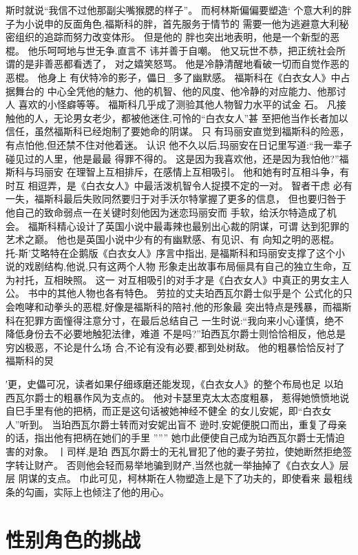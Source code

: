 \documentclass[portrait,a4paper]{article}
\begin{document}
斯时就说“我信不过他那副尖嘴猴腮的样子”。 而柯林斯偏偏要塑造`
个意大利的胖子为小说申的反面角色,福斯科的胖，首先服务于情节的
需要一他为逃避意大利秘密组织的追踪而努力改变体形。 但是他的
胖也突出地表明，他是一个新型的恶棍。 他乐呵呵地与世无争.直言不
讳并善于自嘲。 他又玩世不恭，把正统社会所谓的是非善恶都看透了，
对之嬉笑怒骂。 他是冷静清醒地看破一切而自觉作恶的恶棍。 他身上
有伏特冷的影子，儡日_多了幽默感。 福斯科在《白衣女人》中占据舞台的
中心全凭他的魅力、他的机智、他的风度、他冷静的对应能力、他那讨人
喜欢的小怪癖等等。 福斯科几乎成了测验其他人物智力水平的试金
石。 凡接触他的人，无论男女老少，都被他迷住,可怜的“白衣女人”甚
至把他当作长者加以信任，虽然福斯科已经炮制了要她命的阴谋。 只
有玛丽安直觉到福斯科的险恶，有点怕他,但还禁不住对他着迷。 认识
他不久以后,玛丽安在日记里写道:“我一辈子碰见过的人里，他是最最
得罪不得的。 这是因为我喜欢他，还是因为我怕他?”福斯科与玛丽安
在理智上互相排斥，在感情上互相吸引。 他和她有时互相斗争，有时互
相逗弄，是《白衣女人》中最活泼机智令人捉摸不定的一对。 智者干虑
必有一失，福斯科最后失败同然要归于对手沃尔特掌握了更多的信息，
但也要归咎于他自己的致命弱点一在关键时刻他因为迷恋玛丽安而
手软，给沃尔特造成了机会。
福斯科精心设计了英国小说中最毒辣也最别出心裁的阴谋，可谓
达到犯罪的艺术之巅。 他也是英国小说中少有的有幽默感、有见识、有
向知之明的恶棍。 托-斯'艾略特在企鹅版《白衣女人》序言中指出,
是福斯科和玛丽安支撑了这个小说的戏剧结构,他说,只有这两个人物
形象走出故事布局俪具有自己的独立生命，互为衬托，互相映照。 这一
对互相吸引的对手才是《白衣女人》中真正的男女主人公。
书中的其他人物也各有特色。 劳拉的丈夫珀西瓦尔爵士似乎是个
公式化的只会咆哮和动拳头的恶棍,好像是福斯科的陪衬,他的形象最
突出特点是残暴，而福斯科在犯罪方面憧得注意分寸，在最后总结自己
一生时说:“我向来小心谨慎，绝不降低身份去不必要地触犯法律，难道
不是吗?”珀西瓦尔爵士则恰恰相反，他总是穷凶极恶，不论是什么场
合,不论有没有必要,都到处树敌。 他的粗暴恰恰反衬了福斯科的炅

′更，史儡可况，读者如果仔细琢磨还能发现，《白衣女人》的整个布局也足
以珀西瓦尔爵士的粗暴作风为支点的。 他对卡瑟里克太太态度粗暴，
惹得她愤愤地说自巳手里有他的把柄，而正是这句话被她神经不健全
的女儿安妮，即“白衣女人”听到。 当珀西瓦尔爵士转而对安妮出盲不
逊时,安妮便脱口而出，重复了母亲的话，指出他有把柄在她们的手里
'''''' 她巾此便使自己成为珀西瓦尔爵士无情迫害的对象。 丨司样,是珀
西瓦尔爵士的无礼冒犯了他的妻子劳拉，使她断然拒绝签字转让财产。
否则他会轻而易举地骗到财产,当然也就一举抽掉了《白衣女人》层层
阴谋的支点。 巾此可见，柯林斯在人物塑造上是下了功夫的，即使看来
最粗线条的勾画，实际上也倾注了他的用心。

\section{性别角色的挑战}
\end{document}
